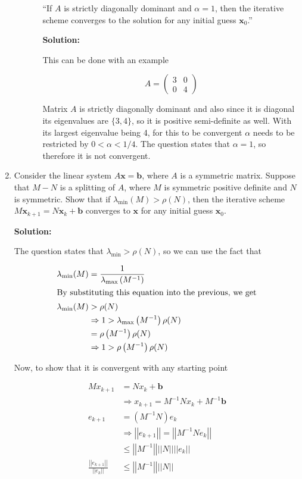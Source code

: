 \documentclass[12pt]{article}
\newcommand{\norm}[1]{\left|\left| #1 \right|\right|}
\newcommand{\vect}{\mathbf}
\newcommand{\inv}[1]{ #1^{-1}}
\newcommand{\minn}{\text{min}}
\newcommand{\maxx}{\text{max}}
\renewcommand{\P}[1]{\left( #1 \right)}
\begin{document}
\begin{enumerate}
\begin{enumerate}
\begin{enumerate}
    ``If $A$ is strictly diagonally dominant and $\alpha = 1$, then the iterative
    scheme converges to the solution for any initial guess $\mathbf{x}_{0}$.''

    {\bf Solution:}

    This can be done with an example

    \[
        A = \begin{pmatrix}3 & 0\\0 & 4 \end{pmatrix}
    \]

    Matrix $A$ is strictly diagonally dominant and also since it is diagonal its eigenvalues
    are $\{ 3, 4\}$, so it is positive semi-definite as well. With its largest eigenvalue being 4,
    for this to be convergent $\alpha$ needs to be restricted by $0 < \alpha < 1/4$. The question
    states that $\alpha = 1$, so therefore it is not convergent.
  \end{enumerate}
\end{enumerate}

\item Consider the linear system $A\mathbf{x} = \mathbf{b}$, where $A$ is a symmetric
matrix. Suppose that $M - N$ is a splitting of $A$, where $M$ is symmetric positive
definite and $N$ is symmetric. Show that if $\lambda_{\minn}(M) > \rho(N)$, then
the iterative scheme $M\mathbf{x}_{k+1} = N\mathbf{x}_{k} + \mathbf{b}$ converges
to $\mathbf{x}$ for any initial guess $\mathbf{x}_{0}$.

{\bf Solution:}

The question states that $\lambda_{\minn} > \rho(N)$, so we can use the fact that

\begin{align}
  \lambda_{\minn}(M) &= \frac{1}{\lambda_{\maxx}\P{\inv{M}}}\nonumber\\
  \intertext{By substituting this equation into the previous, we get}
  \lambda_{\minn}(M) &> \rho(N)\nonumber\\
  &\Rightarrow 1 > \lambda_{\maxx}\P{\inv{M}}\rho(N)\nonumber\\
  &= \rho\P{\inv{M}}\rho(N)\nonumber\\
  &\Rightarrow 1 > \rho\P{\inv{M}}\rho(N)\label{eq:ineq_5}
\end{align}

Now, to show that it is convergent with any starting point

\begin{align*}
  Mx_{k+1} &= Nx_{k} + \vect{b}\\
  &\Rightarrow x_{k+1} = \inv{M}Nx_{k} + \inv{M}\vect{b}\\
  e_{k+1} &= \P{\inv{M}N}e_{k}\\
  &\Rightarrow \norm{e_{k+1}} = \norm{\inv{M}Ne_{k}}\\
  &\leq \norm{\inv{M}}\norm{N}\norm{e_{k}}\\
  \frac{\norm{e_{k+1}}}{\norm{e_{k}}} &\leq \norm{\inv{M}} \norm{N}
\end{align*}


\end{enumerate}
\end{document}
